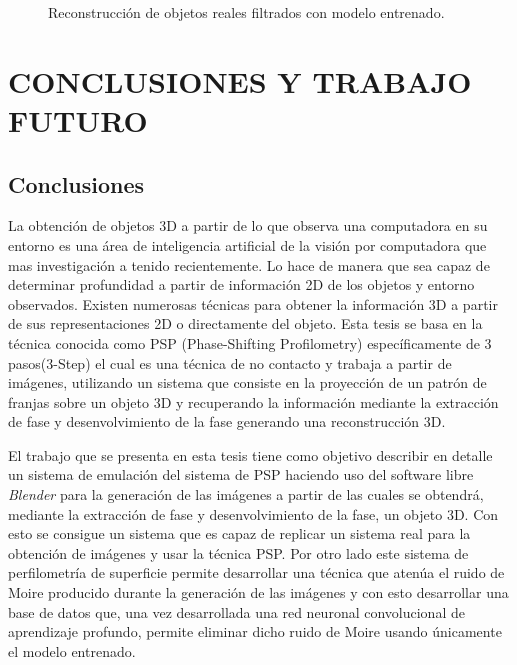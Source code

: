 \documentclass[10pt,letterpaper]{article}
\begin{document}
\begin{figure}[H]
\begin{center}
{            \label{tif177}}
        \caption{Reconstrucción de objetos reales filtrados con modelo entrenado.}
        \label{tif171172173174175176177178179}
      \end{center}
\end{figure}




\section{CONCLUSIONES Y TRABAJO FUTURO}
\subsection{Conclusiones}

La obtención de objetos 3D a partir de lo que observa una computadora en su entorno es una área de inteligencia artificial de la visión por computadora que mas investigación a tenido recientemente. Lo hace de manera que sea capaz de determinar profundidad a partir de información 2D de los objetos y entorno observados. Existen numerosas técnicas para obtener la información 3D a partir de sus representaciones 2D o directamente del objeto. Esta tesis se basa en la técnica conocida como PSP (Phase-Shifting Profilometry) específicamente de 3 pasos(3-Step) el cual es una técnica de no contacto y trabaja a partir de imágenes, utilizando un sistema que consiste en la proyección de un patrón de franjas sobre un objeto 3D y recuperando la información mediante la extracción de fase y desenvolvimiento de la fase generando una reconstrucción 3D.

El trabajo que se presenta en esta tesis tiene como objetivo describir en detalle un sistema de emulación del sistema de PSP haciendo uso del software libre \textit{Blender} para la generación de las imágenes a partir de las cuales se obtendrá, mediante la extracción de fase y desenvolvimiento de la fase, un objeto 3D. Con esto se consigue un sistema que es capaz de replicar un sistema real para la obtención de imágenes y usar la técnica PSP. Por otro lado este sistema de perfilometría de superficie permite desarrollar una técnica que atenúa el ruido de Moire producido durante la generación de las imágenes y con esto desarrollar una base de datos que, una vez desarrollada una red neuronal convolucional de aprendizaje profundo, permite eliminar dicho ruido de Moire usando únicamente el modelo entrenado.
\end{document}
